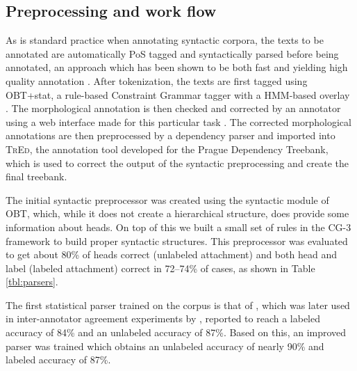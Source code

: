 \documentclass[10pt,a4paper]{article}
\let\app=\textsc
\begin{document}
\subsection{Preprocessing and work flow}
As is standard practice when annotating syntactic corpora, the texts to be
annotated are automatically PoS tagged and syntactically parsed before being
annotated, an approach which has been shown to be both fast and yielding
high quality annotation \cite{Mar:San:Mar:93,For:Sag:10,Skjaerholt:13}.
After tokenization, the texts are first tagged using OBT+stat,
a rule-based Constraint Grammar tagger with a HMM-based overlay \cite{Johannessen:etal:12}.
 The morphological annotation is then checked and corrected by an annotator using a web interface made for this
particular task \cite{Lyn:13}. The corrected morphological annotations are
then preprocessed by a dependency parser and imported into \app{TrEd}, the
annotation tool developed for the Prague Dependency Treebank, which is used to
correct the output of the syntactic preprocessing and create the final
treebank.

The initial syntactic preprocessor was created using
the syntactic module of OBT, which, while it does not create a hierarchical
structure, does provide some information about heads. On top of this we built
a small set of rules in the CG-3 framework \cite{Did:2013} to build proper
syntactic structures. This preprocessor was evaluated to get about 80\% of
heads correct (unlabeled attachment) and both head and label (labeled
attachment) correct in 72--74\% of cases, as shown in Table \ref{tbl:parsers}.

The first statistical parser trained on the corpus is that of
, which was later used in inter-annotator agreement
experiments by , reported to reach a labeled accuracy of
84\% and an unlabeled accuracy of 87\%. Based on this, an improved parser was
trained which obtains an unlabeled accuracy of nearly 90\% and labeled
accuracy of 87\%.
\end{document}
